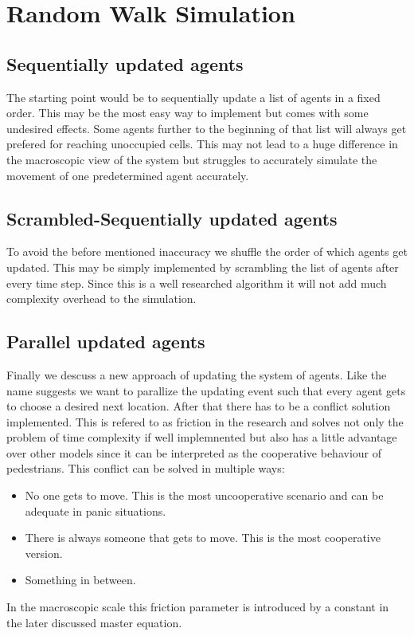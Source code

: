\newpage
\section{Random Walk Simulation}

\subsection{Sequentially updated agents}
The starting point would be to sequentially update a list of agents in a fixed order. This may be the most easy way to implement but comes with some undesired effects. 
Some agents further to the beginning of that list will always get prefered for reaching unoccupied cells. This may not lead to a huge difference in the macroscopic view of the system but struggles to accurately simulate the movement of one predetermined agent accurately.

\subsection{Scrambled-Sequentially updated agents}
To avoid the before mentioned inaccuracy we shuffle the order of which agents get updated. This may be simply implemented by scrambling the list of agents after every time step.
Since this is a well researched algorithm it will not add much complexity overhead to the simulation. 

\subsection{Parallel updated agents}
Finally we descuss a new approach of updating the system of agents. Like the name suggests we want to parallize the updating event such that every agent gets to choose a desired next location. After that there has to be a conflict solution implemented.
This is refered to as friction in the research and solves not only the problem of time complexity if well implemnented but also has a little advantage over other models since it can be interpreted as the cooperative behaviour of pedestrians. 
This conflict can be solved in multiple ways: 
\begin{itemize}
   \item No one gets to move. This is the most uncooperative scenario and can be adequate in panic situations.
   \item There is always someone that gets to move. This is the most cooperative version.
   \item Something in between. 
\end{itemize} 
In the macroscopic scale this friction parameter is introduced by a constant in the later discussed master equation.

